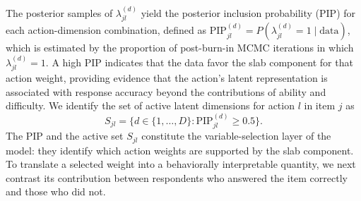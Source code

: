 \documentclass[A4paper,11pt]{article}
\begin{document}
The posterior samples of $\lambda_{jl}^{(d)}$ yield the posterior inclusion probability (PIP) for each action-dimension combination, defined as $\mathrm{PIP}_{jl}^{(d)}=P(\lambda_{jl}^{(d)}=1\mid\text{data})$, which is estimated by the proportion of post-burn-in MCMC iterations in which $\lambda_{jl}^{(d)}=1$. A high PIP indicates that the data favor the slab component for that action weight, providing evidence that the action's latent representation is associated with response accuracy beyond the contributions of ability and difficulty. We identify the set of active latent dimensions for action $l$ in item $j$ as
\begin{equation}\label{eq:active_set}
S_{jl}=\bigl\{d\in\{1,\ldots,D\}:
\mathrm{PIP}_{jl}^{(d)}\geq 0.5\bigr\}.
\end{equation}
The PIP and the active set $S_{jl}$ constitute the variable-selection layer of the model: they identify which action weights are supported by the slab component. To translate a selected weight into a behaviorally interpretable quantity, we next contrast its contribution between respondents who answered the item correctly and those who did not.
\end{document}
